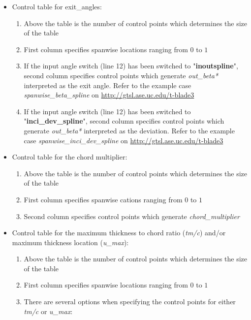 \documentclass[8pt]{article}
\begin{document}
\begin{itemize}[leftmargin=*]
\begin{enumerate}[label=\alph*]
    \end{enumerate}
    \item Control table for exit\_angles:
    \begin{enumerate}[label=\alph*]
        \item Above the table is the number of control points which determines the size of the table
        \item First column specifies spanwise locations ranging from $0$ to $1$
        \item If the input angle switch (line 12) has been switched to "\textbf{inoutspline}", second column specifies control points which generate \textit{out\_beta*} interpreted as the exit angle. Refer to the example case \textit{spanwise\_beta\_spline} on \url{http://gtsl.ase.uc.edu/t-blade3}
        \item If the input angle switch (line 12) has been switched to "\textbf{inci\_dev\_spline}", second column specifies control points which generate \textit{out\_beta*} interpreted as the deviation. Refer to the example case \textit{spanwise\_inci\_dev\_spline} on \url{http://gtsl.ase.uc.edu/t-blade3}
    \end{enumerate}
    \item Control table for the chord multiplier:
    \begin{enumerate}[label=\alph*]
        \item Above the table is the number of control points which determines the size of the table
        \item First column specifies spanwise cations ranging from $0$ to $1$
        \item Second column specifies control points which generate \textit{chord\_multiplier}
    \end{enumerate}
    \item Control table for the maximum thickness to chord ratio (\textit{tm/c}) and/or maximum thickness location (\textit{u\_max}):
    \begin{enumerate}[label=\alph*]
        \item Above the table is the number of control points which determines the size of the table
        \item First column specifies spanwise locations ranging from $0$ to $1$
        \item There are several options when specifying the control points for either \textit{tm/c} or \textit{u\_max}:
        \begin{itemize}[label=\FilledSmallSquare]

\end{itemize}
\end{enumerate}
\end{itemize}
\end{document}
